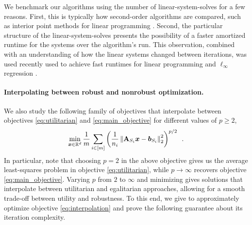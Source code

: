 \begin{remark}\label{rem:linear_systems}
    We benchmark our algorithms using the number of linear-system-solves for a few reasons. First, this is typically how second-order algorithms are compared, such as interior point methods for linear programming \citep{ls19}. Second, the particular structure of the linear-system-solves presents the possibility of a faster amortized runtime for the systems over the algorithm's run. This observation, combined with an understanding of how the linear systems changed between iterations, was used recently used to achieve fast runtimes for linear programming \citep{ls19} and $\ell_{\infty}$ regression \citep{ajk24}.
\end{remark}

\paragraph{Interpolating between robust and nonrobust optimization.} We also study the following family of objectives that interpolate between objectives \ref{eq:utilitarian} and \ref{eq:main_objective} for different values of $p\geq 2$,
\begin{align}
    \min_{\bm{x}\in\mathbb{R}^d}\frac{1}{m}\sum_{i\in[m]}\left(\frac{1}{n_i}\left\lVert \mathbf{A}_{S_i}\bm{x}-\bm{b}_{S_i} \right\rVert_2^2\right)^{p/2}\enspace.\label{eq:interpolation}
\end{align}
In particular, note that choosing $p=2$ in the above objective gives us the average least-squares problem in objective \ref{eq:utilitarian}, while $p\to\infty$ recovers objective \ref{eq:main_objective}. Varying $p$ from $2$ to $\infty$ and minimizing gives solutions that interpolate between utilitarian and egalitarian approaches, allowing for a smooth trade-off between utility and robustness. To this end, we give  to approximately optimize objective \ref{eq:interpolation} and prove the following guarantee about its iteration complexity.

